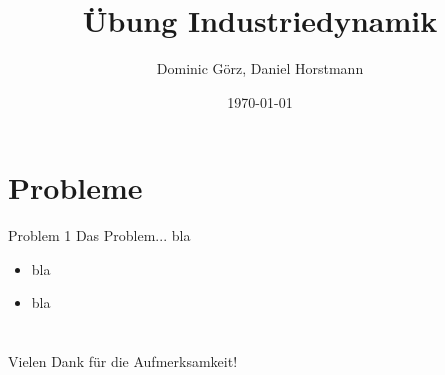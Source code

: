 \documentclass[xcolor={dvipsnames}]{beamer}
\title[Industriedynamik]{Übung Industriedynamik}
\author{Dominic Görz, Daniel Horstmann}
\date{\today}
\begin{document}
\begin{frame}
  \maketitle
\end{frame}


\section{Probleme}

\begin{frame}{Problem 1}
  Das Problem... bla 
  \begin{itemize}
  \item bla
  \item bla
  \end{itemize}
\end{frame}


\section*{}
\begin{frame}
\centering
 Vielen Dank für die Aufmerksamkeit!
\end{frame}
\end{document}

